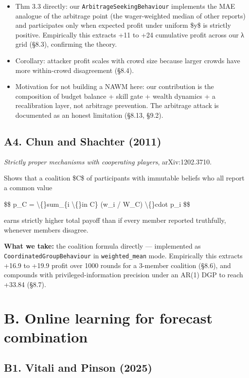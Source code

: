 \documentclass[11pt,a4paper,openany]{report}
\begin{document}
\begin{itemize}
  \item Thm 3.3 directly: our \texttt{ArbitrageSeekingBehaviour} implements the
    MAE analogue of the arbitrage point (the wager-weighted median of
    other reports) and participates only when expected profit under
    uniform \$y\$ is strictly positive. Empirically this extracts
    +11 to +24 cumulative profit across our λ grid (§8.3), confirming
    the theory.
  \item Corollary: attacker profit scales with crowd size because larger
    crowds have more within-crowd disagreement (§8.4).
  \item Motivation for not building a NAWM here: our contribution is the
    composition of budget balance + skill gate + wealth dynamics + a
    recalibration layer, not arbitrage prevention. The arbitrage
    attack is documented as an honest limitation (§8.13, §9.2).
\end{itemize}

\subsection{A4. Chun and Shachter (2011)}

\emph{Strictly proper mechanisms with cooperating players},
arXiv:1202.3710.

Shows that a coalition \$C\$ of participants with immutable beliefs who
all report a common value

\$\$
p\_C = \textbackslash\{\}sum\_\{i \textbackslash\{\}in C\} (w\_i / W\_C) \textbackslash\{\}cdot p\_i
\$\$

earns strictly higher total payoff than if every member reported
truthfully, whenever members disagree.

\textbf{What we take:} the coalition formula directly — implemented as
\texttt{CoordinatedGroupBehaviour} in \texttt{weighted\_mean} mode. Empirically this
extracts +16.9 to +19.9 profit over 1000 rounds for a 3-member
coalition (§8.6), and compounds with privileged-information precision
under an AR(1) DGP to reach +33.84 (§8.7).

\section{B. Online learning for forecast combination}

\subsection{B1. Vitali and Pinson (2025)}
\end{document}
